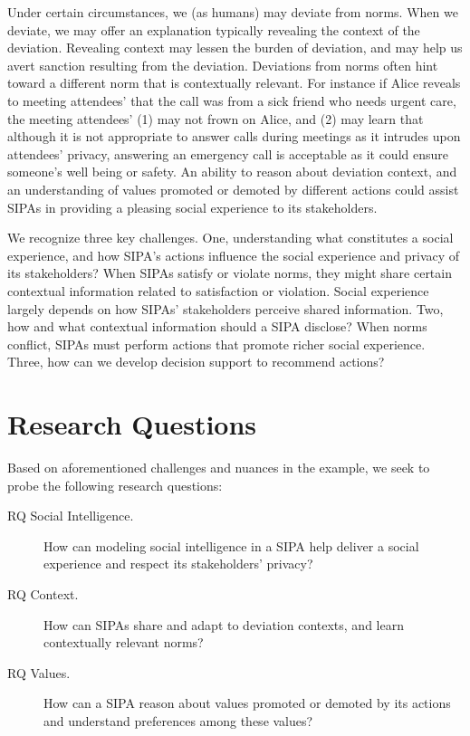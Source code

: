 Under certain circumstances, we (as humans) may deviate from norms. When
we deviate, we may offer an explanation typically revealing the context
of the deviation. Revealing context may lessen the burden of deviation,
and may help us avert sanction resulting from the deviation. Deviations
from norms often hint toward a different norm that is contextually
relevant. For instance if Alice reveals to meeting attendees' that the
call was from a sick friend who needs urgent care, the meeting
attendees' (1) may not frown on Alice, and (2) may learn that although
it is not appropriate to answer calls during meetings as it intrudes
upon attendees' privacy, answering an emergency call is acceptable as it
could ensure someone's well being or safety. An ability to reason about
deviation context, and an understanding of values promoted or demoted by different
actions could assist SIPAs in providing a pleasing social experience to
its stakeholders.

We recognize three key challenges. One, understanding what constitutes a
social experience, and how SIPA's actions influence the social
experience and privacy of its stakeholders? When SIPAs satisfy or violate
norms, they might share certain contextual information related to
satisfaction or violation. Social experience largely depends on how
SIPAs' stakeholders perceive shared information. Two, how and what
contextual information should a SIPA disclose? When norms conflict,
SIPAs must perform actions that promote richer social experience. Three,
how can we develop decision support to recommend actions?

\section{Research Questions}
\label{sec:intro-questions}

Based on aforementioned challenges and nuances in the example, we seek 
to probe the following research questions: 

\begin{description}

\item[RQ Social Intelligence.] How can modeling social intelligence in a SIPA help deliver a social experience and respect its stakeholders' privacy?

\item[RQ Context.] How can SIPAs share and adapt to deviation contexts, and learn contextually relevant norms? 

\item[RQ Values.] How can a SIPA reason about values promoted or demoted by its actions and understand preferences among these values?

\end{description}

